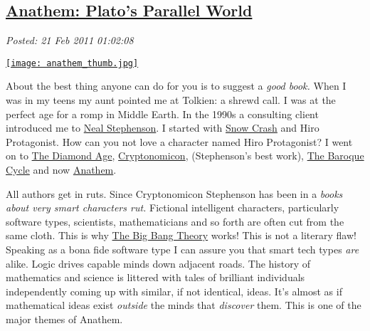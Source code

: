 %

\subsection*{\href{https://bakerjd99.wordpress.com/2011/02/20/anathem-platos-parallel-world/}{Anathem: Plato's Parallel World}}


\noindent\emph{Posted: 21 Feb 2011 01:02:08}
\vspace{6pt}

\captionsetup[floatingfigure]{labelformat=empty}
\begin{floatingfigure}[l]{0.25\textwidth}
\centering
\href{http://www.amazon.com/Anathem-Neal-Stephenson/dp/0061474096}{\texttt{[image: anathem\_thumb.jpg]}}
\label{fig:1124X0}
\end{floatingfigure}About the best thing anyone can do for you is to suggest a \emph{good
book.} When I was in my teens my aunt pointed me at Tolkien: a shrewd
call. I was at the perfect age for a romp in Middle Earth. In the 1990s
a consulting client introduced me to
\href{http://www.nealstephenson.com/}{Neal Stephenson}. I started with
\href{http://www.amazon.com/Snow-Crash-Bantam-Spectra-Book/dp/0553380958}{Snow
Crash} and Hiro Protagonist. How can you not love a character named Hiro
Protagonist? I went on to
\href{http://www.amazon.com/Diamond-Age-Neal-Stephenson/dp/0553573314}{The
Diamond Age},
\href{http://www.amazon.com/Cryptonomicon-Neal-Stephenson/dp/0380973464}{Cryptonomicon},
(Stephenson's best work),
\href{http://en.wikipedia.org/wiki/The\_Baroque\_Cycle}{The Baroque
Cycle} and now
\href{http://www.amazon.com/Anathem-Neal-Stephenson/dp/0061474096}{Anathem}.

All authors get in ruts. Since Cryptonomicon Stephenson has been in a
\emph{books about very smart characters rut.} Fictional intelligent
characters, particularly software types, scientists, mathematicians and
so forth are often cut from the same cloth. This is why
\href{http://www.cbs.com/primetime/big\_bang\_theory/}{The Big Bang
Theory} works!
This is not a literary flaw! Speaking as a bona fide software type I can
assure you that smart tech types \emph{are} alike. Logic drives capable
minds down adjacent roads. The history of mathematics and science is
littered with tales of brilliant individuals independently coming up
with similar, if not identical, ideas. It's almost as if mathematical
ideas exist \emph{outside} the minds that \emph{discover} them. This is
one of the major themes of Anathem.


